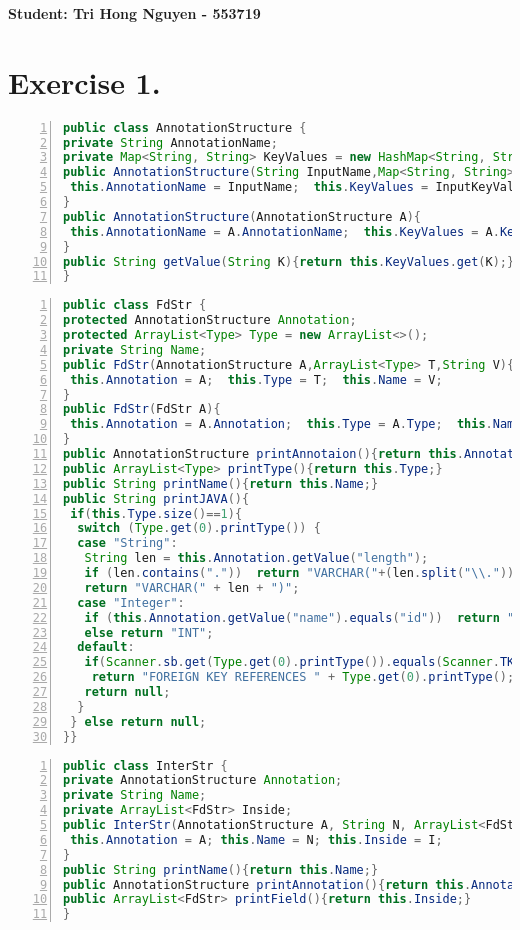 \documentclass[10pt]{report}
\begin{document}


\newpage
\newpage
\begin{center}
\textbf{Student: Tri Hong Nguyen - 553719}
\end{center}
\section{Exercise 1.}
\label{AnnotationStructure}
\begin{lstlisting}[numbers=left,language=Java,frame=single,breaklines=true,label=Code:ReadGraph, caption=Annotation Structure.]
public class AnnotationStructure {
private String AnnotationName;
private Map<String, String> KeyValues = new HashMap<String, String>();
public AnnotationStructure(String InputName,Map<String, String> InputKeyValues){
 this.AnnotationName = InputName;  this.KeyValues = InputKeyValues;
}
public AnnotationStructure(AnnotationStructure A){
 this.AnnotationName = A.AnnotationName;  this.KeyValues = A.KeyValues;
}
public String getValue(String K){return this.KeyValues.get(K);}
}
\end{lstlisting}
\label{FieldStructure}
\begin{lstlisting}[numbers=left,language=Java,frame=single,breaklines=true,label=Code:ReadGraph, caption=Field Structure.]
public class FdStr {
protected AnnotationStructure Annotation;
protected ArrayList<Type> Type = new ArrayList<>();
private String Name;
public FdStr(AnnotationStructure A,ArrayList<Type> T,String V){
 this.Annotation = A;  this.Type = T;  this.Name = V;
}
public FdStr(FdStr A){
 this.Annotation = A.Annotation;  this.Type = A.Type;  this.Name = A.Name;
}
public AnnotationStructure printAnnotaion(){return this.Annotation;}
public ArrayList<Type> printType(){return this.Type;}
public String printName(){return this.Name;}
public String printJAVA(){
 if(this.Type.size()==1){
  switch (Type.get(0).printType()) {
  case "String": 
   String len = this.Annotation.getValue("length");
   if (len.contains("."))  return "VARCHAR("+(len.split("\\."))[0]+")";
   return "VARCHAR(" + len + ")";
  case "Integer": 
   if (this.Annotation.getValue("name").equals("id"))  return "INT NOT NULL PRIMARY KEY";
   else return "INT";
  default:
   if(Scanner.sb.get(Type.get(0).printType()).equals(Scanner.TKT.NEWTYPE) && this.Annotation.getValue("target").equals(Type.get(0).printType()))
    return "FOREIGN KEY REFERENCES " + Type.get(0).printType();
   return null;  
  }
 } else return null;
}}
\end{lstlisting}
\label{InterStr}
\begin{lstlisting}[numbers=left,language=Java,frame=single,breaklines=true,label=Code:ReadGraph, caption=Interface Structure.]
public class InterStr {
private AnnotationStructure Annotation;
private String Name;
private ArrayList<FdStr> Inside;
public InterStr(AnnotationStructure A, String N, ArrayList<FdStr> I){
 this.Annotation = A; this.Name = N; this.Inside = I;
}
public String printName(){return this.Name;}
public AnnotationStructure printAnnotation(){return this.Annotation;}
public ArrayList<FdStr> printField(){return this.Inside;}
}
\end{lstlisting}
\end{document}
